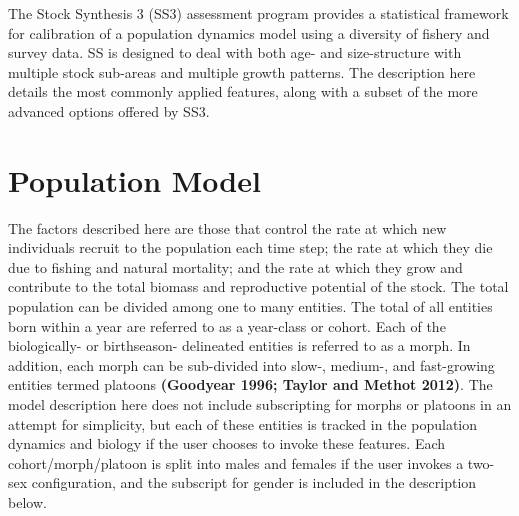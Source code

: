 \documentclass[11pt,
  english,
  letterpaper,
]{article}
\begin{document}
\pagebreak
{}
\setcounter{page}{1}

\renewcommand{\thetable}{\roman{table}}
\renewcommand{\thefigure}{\roman{figure}}

\setlength\parskip{0.5em plus 0.1em minus 0.2em}

\pagebreak
\setlength{\parskip}{5mm plus1mm minus1mm}
\setcounter{page}{1}
\renewcommand{\thefigure}{\arabic{figure}}
\renewcommand{\thetable}{\arabic{table}}
\setcounter{table}{0}
\setcounter{figure}{0}


The Stock Synthesis 3 (SS3) assessment program provides a statistical framework for calibration of a population dynamics model using a diversity of fishery and survey data. SS is designed to deal with both age- and size-structure with multiple stock sub-areas and multiple growth patterns. The description here details the most commonly applied features, along with a subset of the more advanced options offered by SS3.

\leavevmode\tagmcend\tagstructend\par


\hypertarget{population-model}{%
\section{Population Model}\label{population-model}}

\leavevmode\tagmcend\tagstructend


The factors described here are those that control the rate at which new individuals recruit to the population each time step; the rate at which they die due to fishing and natural mortality; and the rate at which they grow and contribute to the total biomass and reproductive potential of the stock. The total population can be divided among one to many entities. The total of all entities born within a year are referred to as a year-class or cohort. Each of the biologically- or birthseason- delineated entities is referred to as a morph. In addition, each morph can be sub-divided into slow-, medium-, and fast-growing entities termed platoons \textbf{(Goodyear 1996; Taylor and Methot 2012)}. The model description here does not include subscripting for morphs or platoons in an attempt for simplicity, but each of these entities is tracked in the population dynamics and biology if the user chooses to invoke these features. Each cohort/morph/platoon is split into males and females if the user invokes a two-sex configuration, and the subscript for gender is included in the description below.
\end{document}
